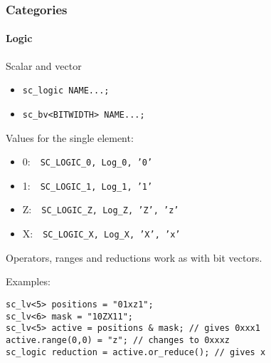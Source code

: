 \begin{frame}[fragile]
\frametitle{Categories}
\framesubtitle{Logic}

{\scriptsize 
\begin{block}{Scalar and vector}
\begin{itemize}
\item \texttt{sc\_logic NAME...;}
\item \texttt{sc\_bv<BITWIDTH> NAME...;}
\end{itemize}
Values for the single element:
\begin{itemize}
\item 0: \,\, \texttt{SC\_LOGIC\_0, Log\_0, '0'}
\item 1: \,\, \texttt{SC\_LOGIC\_1, Log\_1, '1'}
\item Z: \,\, \texttt{SC\_LOGIC\_Z, Log\_Z, 'Z', 'z'}
\item X: \,\, \texttt{SC\_LOGIC\_X, Log\_X, 'X', 'x'}
\end{itemize}
Operators, ranges and reductions work as with bit vectors.
\end{block}
\pause
\begin{block}{Examples:} 
\vspace{-1em}
\begin{verbatim}
sc_lv<5> positions = "01xz1";
sc_lv<6> mask = "10ZX11";
sc_lv<5> active = positions & mask; // gives 0xxx1
active.range(0,0) = "z"; // changes to 0xxxz
sc_logic reduction = active.or_reduce(); // gives x
\end{verbatim}
\vspace{-1em}
\end{block}
}
\end{frame}

